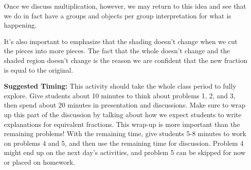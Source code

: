 \documentclass{ximera}
\begin{document}
\begin{instructorNotes}
Once we discuss multiplication, however, we may return to this idea and see that we do in fact have a groups and objects per group interpretation for what is happening.

It's also important to emphasize that the shading doesn't change when we cut the pieces into more pieces. The fact that the whole doesn't change and the shaded region doesn't change is the reason we are confident that the new fraction is equal to the original.



{\bf Suggested Timing:} This activity should take the whole class period to fully explore. Give students about 10 minutes to think about problems 1, 2, and 3, then spend about 20 minutes in presentation and discussions. Make sure to wrap up this part of the discussion by talking about how we expect students to write explanations for equivalent fractions. This wrap-up is more important than the remaining problems! With the remaining time, give students 5-8 minutes to work on problems 4 and 5, and then use the remaining time for discussion. Problem 4 might end up on the next day's activities, and problem 5 can be skipped for now or placed on homework.
\end{instructorNotes}
\end{document}
